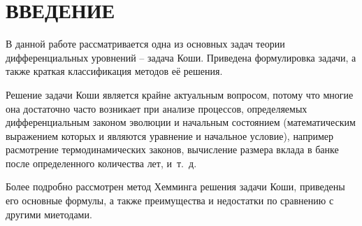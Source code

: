 \section*{ВВЕДЕНИЕ}

В данной работе рассматривается одна из основных задач теории
дифференциальных уровнений -- задача Коши. Приведена формулировка задачи,
а также краткая классификация методов её решения.

Решение задачи Коши является крайне актуальным вопросом, потому что
многие она достаточно часто возникает при анализе процессов,
определяемых дифференциальным законом эволюции и начальным состоянием
(математическим выражением которых и являются уравнение и начальное
условие), например расмотрение термодинамических законов, вычисление
размера вклада в банке после определенного количества лет, и~т.~д.

Более подробно рассмотрен
метод Хемминга решения задачи Коши, приведены его основные формулы, а также
преимущества и недостатки по сравнению с другими миетодами.

\pagebreak
